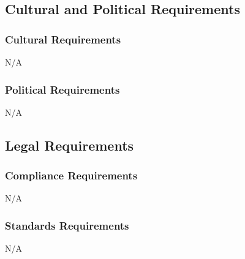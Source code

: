 \documentclass[]{article}
\begin{document}
\subsection{Cultural and Political Requirements}
\label{sub:cultural_and_political_requirements}

\subsubsection{Cultural Requirements}
\label{ssub:cultural_requirements}
N/A

\subsubsection{Political Requirements}
\label{ssub:political_requirements}
N/A

\subsection{Legal Requirements}
\label{sub:legal_requirements}

\subsubsection{Compliance Requirements}
\label{ssub:compliance_requirements}
N/A

\subsubsection{Standards Requirements}
\label{ssub:standards_requirements}
N/A

\appendix
\end{document}
